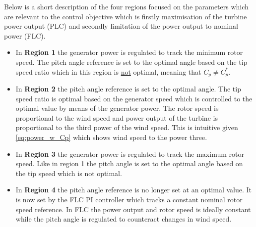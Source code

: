 Below is a short description of the four regions focused on the parameters which are relevant to the control objective which is firstly maximisation of the turbine power output (PLC) and secondly limitation of the power output to nominal power (FLC).
\begin{itemize}
	\item In \textbf{Region 1} the generator power is regulated to track the minimum rotor speed. The pitch angle reference is set to the optimal angle based on the tip speed ratio which in this region is \underline{not} optimal, meaning that $ C_p \neq C_p^* $. 
	\item In \textbf{Region 2} the pitch angle reference is set to the optimal angle. The tip speed ratio is optimal based on the generator speed which is controlled to the optimal value by means of the generator power. The rotor speed is proportional to the wind speed and power output of the turbine is proportional to the third power of the wind speed. This is intuitive given \cref{eq:power_w_Cp} which shows wind speed to the power three.
	\item In \textbf{Region 3} the generator power is regulated to track the maximum rotor speed. Like in region 1 the pitch angle is set to the optimal angle based on the tip speed which is not optimal.
	\item In \textbf{Region 4} the pitch angle reference is no longer set at an optimal value. It is now set by the FLC PI controller which tracks a constant nominal rotor speed reference. In FLC the power output and rotor speed is ideally constant while the pitch angle is regulated to counteract changes in wind speed.
\end{itemize}




